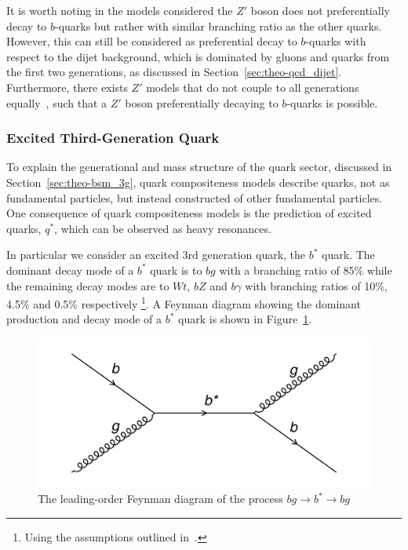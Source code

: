 It is worth noting in the models considered the $Z'$ boson does not preferentially decay to $b$-quarks but rather with similar branching ratio as the other quarks.
However, this can still be considered as preferential decay to $b$-quarks with respect to the dijet background,
which is dominated by gluons and quarks from the first two generations, as discussed in Section~\ref{sec:theo-qcd_dijet}.
Furthermore, there exists $Z'$ models that do not couple to all generations equally~\cite{theo-bsm_zprime_3g},
such that a $Z'$ boson preferentially decaying to $b$-quarks is possible.

\subsubsection{Excited Third-Generation Quark}
\label{sec:theo-bsm_bstar}

To explain the generational and mass structure of the quark sector, discussed in Section~\ref{sec:theo-bsm_3g},
quark compositeness models describe quarks, not as fundamental particles, but instead constructed of other fundamental particles.
One consequence of quark compositeness models is the prediction of excited quarks, $q^{*}$, which can be observed as heavy resonances.

In particular we consider an excited 3rd generation quark, the $b^{*}$ quark.
The dominant decay mode of a $b^{*}$ quark is to $bg$ with a branching ratio of 85\%
while the remaining decay modes are to $Wt$, $bZ$ and $b\gamma$ with branching ratios of 10\%, 4.5\% and 0.5\% respectively
\footnote{Using the assumptions outlined in~\cite{theo-bsm_bstar}.}.
A Feynman diagram showing the  dominant production and decay mode of a $b^*$ quark is shown in Figure~\ref{fig:theo-bsm_bstar}.

\begin{figure}[!hbt]
  \begin{center}
    \includegraphics[width=0.7\linewidth, angle=0]{figs/Theory/bsm_bstar.png}
  \end{center}
  \caption{The leading-order Feynman diagram of the process $bg \to b^* \to bg$}
  \label{fig:theo-bsm_bstar}
\end{figure}


